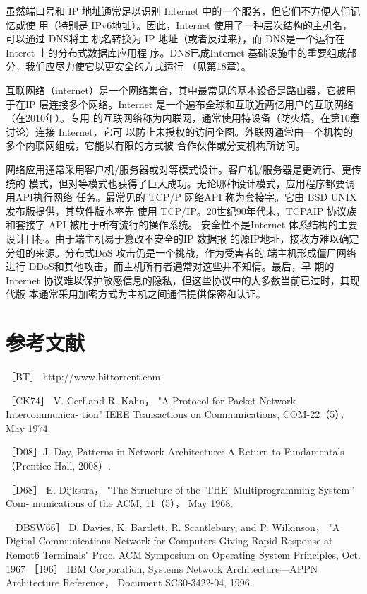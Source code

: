 虽然端口号和 IP 地址通常足以识别 Internet 中的一个服务，但它们不方便人们记忆或使
用（特别是 IPv6地址）。因此，Internet 使用了一种层次结构的主机名，可以通过 DNS将主
机名转换为 IP 地址（或者反过来），而 DNS是一个运行在 Interet 上的分布式数据库应用程
序。DNS已成Internet 基础设施中的重要组成部分，我们应尽力使它以更安全的方式运行
（见第18章）。

互联网络（internet）是一个网络集合，其中最常见的基本设备是路由器，它被用于在IP
层连接多个网络。Internet 是一个遍布全球和互联近两亿用户的互联网络（在2010年）。专用
的互联网络称为内联网，通常使用特设备（防火墙，在第10章讨论）连接 Internet，它可
以防止未授权的访问企图。外联网通常由一个机构的多个内联网组成，它能以有限的方式被
合作伙伴或分支机构所访问。

网络应用通常采用客户机/服务器或对等模式设计。客户机/服务器是更流行、更传统的
模式，但对等模式也获得了巨大成功。无论哪种设计模式，应用程序都要调用API执行网络
任务。最常见的 TCP/P 网络API 称为套接字。它由 BSD UNIX 发布版提供，其软件版本率先
使用 TCP/IP。20世纪90年代末，TCPAIP 协议族和套接字 API 被用于所有流行的操作系统。
安全性不是Internet 体系结构的主要设计目标。由于端主机易于篡改不安全的IP 数据报
的源IP地址，接收方难以确定分组的来源。分布式DoS 攻击仍是一个挑战，作为受害者的
端主机形成僵尸网络进行 DDoS和其他攻击，而主机所有者通常对这些并不知情。最后，早
期的 Internet 协议难以保护敏感信息的隐私，但这些协议中的大多数当前已过时，其现代版
本通常采用加密方式为主机之间通信提供保密和认证。

\section{参考文献}
\iffalse

［BT］ http://www.bittorrent.com

［CK74］ V. Cerf and R. Kahn， "A Protocol for Packet Network Intercommunica-
tion" IEEE Transactions on Communications, COM-22（5）， May 1974.

［D08］J. Day, Patterns in Network Architecture: A Return to
Fundamentals （Prentice
Hall, 2008）.

［D68］ E. Dijkstra， "The Structure of the 'THE'-Multiprogramming System” Com-
munications of the ACM, 11（5）， May 1968.

［DBSW66］ D. Davies, K. Bartlett, R. Scantlebury, and P. Wilkinson， "A Digital
Communications Network for Computers Giving Rapid Response at Remot6
Terminals" Proc. ACM Symposium on Operating System Principles, Oct. 1967
［196］ IBM Corporation, Systems Network Architecture—APPN Architecture Reference，
Document SC30-3422-04, 1996.

